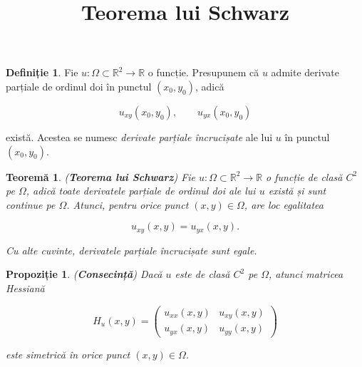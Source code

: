 \documentclass[12pt]{article}
\title{Teorema lui Schwarz}
\author{}
\date{}
\theoremstyle{definition}
\newtheorem{definition}{Definiție}
\theoremstyle{plain}
\newtheorem{theorem}{Teoremă}
\newtheorem{proposition}{Propoziție}
\begin{document}
\maketitle

\begin{definition}
Fie $u : \Omega \subset \mathbb{R}^2 \to \mathbb{R}$ o funcție.  
Presupunem că $u$ admite derivate parțiale de ordinul doi în punctul $(x_0, y_0)$, adică


\[
u_{xy}(x_0,y_0), \qquad u_{yx}(x_0,y_0)
\]


există. Acestea se numesc \emph{derivate parțiale încrucișate} ale lui $u$ în punctul $(x_0,y_0)$.
\end{definition}

\begin{theorem}
(\textbf{Teorema lui Schwarz})  
Fie $u : \Omega \subset \mathbb{R}^2 \to \mathbb{R}$ o funcție de clasă $C^2$ pe $\Omega$, adică toate derivatele parțiale de ordinul doi ale lui $u$ există și sunt continue pe $\Omega$.  
Atunci, pentru orice punct $(x,y) \in \Omega$, are loc egalitatea


\[
u_{xy}(x,y) = u_{yx}(x,y).
\]


Cu alte cuvinte, derivatele parțiale încrucișate sunt egale.
\end{theorem}

\begin{proposition}
(\textbf{Consecință})  
Dacă $u$ este de clasă $C^2$ pe $\Omega$, atunci matricea Hessiană


\[
H_u(x,y) =
\begin{pmatrix}
u_{xx}(x,y) & u_{xy}(x,y) \\
u_{yx}(x,y) & u_{yy}(x,y)
\end{pmatrix}
\]


este simetrică în orice punct $(x,y) \in \Omega$.
\end{proposition}
\end{document}
